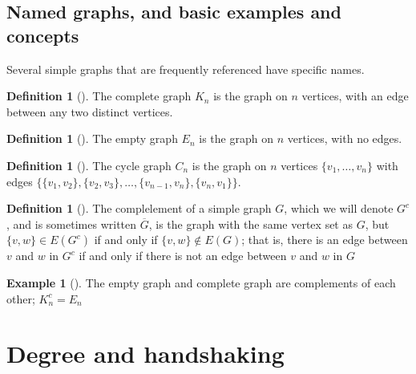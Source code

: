 \documentclass[10pt,]{book}
\theoremstyle{plain}
\theoremstyle{definition}
\newtheorem{definition}[theorem]{Definition}
\theoremstyle{definition}
\theoremstyle{definition}
\newtheorem{example}[theorem]{Example}
\theoremstyle{definition}
\numberwithin{equation}{section}
\begin{document}
\subsection[{Named graphs, and basic examples and concepts}]{Named graphs, and basic examples and concepts}\label{subsection-3}
\hypertarget{p-12}{}%
Several simple graphs that are frequently referenced have specific names.%
\begin{definition}[{}]\label{definition-2}
\hypertarget{p-13}{}%
The complete graph \(K_n\) is the graph on \(n\) vertices, with an edge between any two distinct vertices.%
\end{definition}
\begin{definition}[{}]\label{definition-3}
\hypertarget{p-14}{}%
The empty graph \(E_n\) is the graph on \(n\) vertices, with no edges.%
\end{definition}
\begin{definition}[{}]\label{definition-4}
\hypertarget{p-15}{}%
The cycle graph \(C_n\) is the graph on \(n\) vertices \(\{v_1,\dots, v_n\}\) with edges \(\{ \{v_1, v_2\}, \{v_2,v_3\},\dots,\{v_{n-1},v_n\}, \{v_n, v_1\}\}\).%
\end{definition}
\begin{definition}[{}]\label{definition-5}
\hypertarget{p-16}{}%
The complelement of a simple graph \(G\), which we will denote \(G^c\), and is sometimes written \(\overline{G}\), is the graph with the same vertex set as \(G\), but \(\{v,w\}\in E(G^c)\) if and only if \(\{v,w\}\notin E(G)\); that is, there is an edge between \(v\) and \(w\) in \(G^c\) if and only if there is not an edge between \(v\) and \(w\) in \(G\)%
\end{definition}
\begin{example}[]\label{example-2}
\hypertarget{p-17}{}%
The empty graph and complete graph are complements of each other; \(K_n^c=E_n\)%
\end{example}
\typeout{************************************************}
\typeout{************************************************}
\section[{Degree and handshaking}]{Degree and handshaking}\label{s_intro_degrees}
\typeout{************************************************}
\typeout{************************************************}
\end{document}
